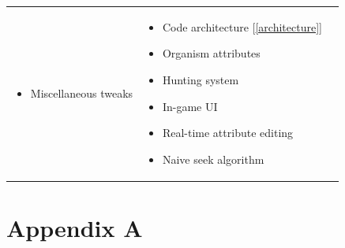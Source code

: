 \documentclass[a4paper, oneside, 11pt]{report}
\begin{document}
{\begin{center}
\begin{tabular}{c|p{}|p{}}
\begin{itemize}
			\item Miscellaneous tweaks
		\end{itemize} & \begin{itemize}
			\itemsep0em
			\item Code architecture [\ref{architecture}]
			\item Organism attributes
			\item Hunting system
			\item In-game UI
			\item Real-time attribute editing
			\item Naive seek algorithm
		\end{itemize} \\
	\end{tabular}
\end{center}

\chapter*{Appendix A}

}
\end{document}
